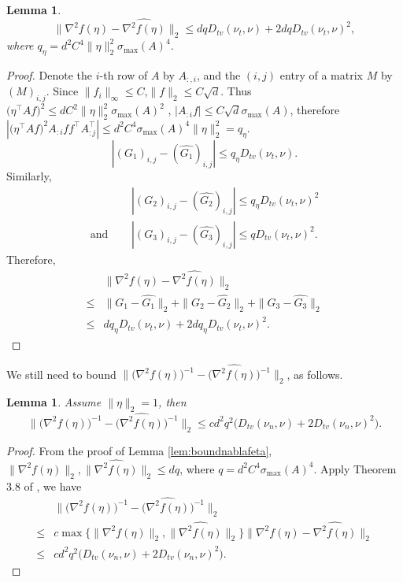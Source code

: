 \documentclass[english]{article} %
\providecommand{\lemmaname}{Lemma}
\theoremstyle{plain}
\newtheorem{lemma}[thm]{\protect\lemmaname}
\theoremstyle{definition}
\theoremstyle{remark}
\begin{document}
\begin{lemma}
\label{lem:nablavariation}
\[
\|\nabla^2 f(\eta) - \widehat{\nabla^2 f(\eta)}  \|_2 \le d q D_{tv}(\nu_t , \nu) + 2dq D_{tv}(\nu_t , \nu)^2,
\]
where $q_{\eta} = d^2C^4\|\eta\|_2^2\sigma_{\max}(A)^4$.
\end{lemma}
\begin{proof}
Denote the $i$-th row of $A$ by $A_{:,i}$, and the $(i,j)$ entry of a matrix $M$ by $(M)_{i,j}$. Since $\|f_i\|_\infty \le C$,$\|f\|_2 \le C\sqrt{d}$. 
Thus $\big(\eta^{\top}Af\big)^2 \le d C^2\|\eta\|_2^2\sigma_{\max}(A)^2$ 
,  $|A_{:i}f| \le C\sqrt{d}\sigma_{\max}(A)$, 
therefore $|\big(\eta^{\top}Af\big)^2 A_{:i}ff^{\top} A_{:j}^{\top}| \le d^2C^4\sigma_{\max}(A)^4 \|\eta\|_2^2 = q_{\eta}$.
\[
|(G_1)_{i,j} - (\widehat{G_1})_{i,j} | \le q_{\eta} D_{tv}(\nu_t , \nu).
\]
Similarly, 
\begin{align*}
& |(G_2)_{i,j} - (\widehat{G_2})_{i,j} | \le q_{\eta} D_{tv}(\nu_t , \nu)^2 \\
\text{and } \quad & |(G_3)_{i,j} - (\widehat{G_3})_{i,j} | \le q D_{tv}(\nu_t , \nu)^2.
\end{align*}
Therefore,
\begin{align*}
	& \|\nabla^2 f(\eta) - \widehat{\nabla^2 f(\eta)}  \|_2 \\
\le & \|G_1 - \widehat{G_1}\|_2 + \|G_2 - \widehat{G_2}\|_2 + \|G_3 - \widehat{G_3}\|_2 \\
\le & d q_{\eta} D_{tv}(\nu_t , \nu) + 2dq_{\eta} D_{tv}(\nu_t , \nu)^2.
\end{align*}
\end{proof}

We still need to bound $\|\big(\nabla^2 f(\eta)\big)^{-1} - \big(\widehat{\nabla^2 f(\eta)}\big)^{-1}  \|_2 $, as follows.
\begin{lemma}
Assume $\|\eta\|_2 = 1$, then 
\[
\|\big(\nabla^2 f(\eta)\big)^{-1} - \big(\widehat{\nabla^2 f(\eta)}\big)^{-1}  \|_2 \le cd^2q^2\big(D_{tv}(\nu_n , \nu) + 2D_{tv}(\nu_n , \nu)^2\big).
\]
\end{lemma}
\begin{proof}
From the proof of Lemma \ref{lem:boundnablafeta}, $\|\nabla^2 f(\eta)\|_2, \|\widehat{\nabla^2 f(\eta)}\|_2 \le dq$, where $q = d^2C^4\sigma_{\max}(A)^4$.
Apply Theorem 3.8 of \citep*{stewart1990matrix}, we have 
\begin{align*}
& \|\big(\nabla^2 f(\eta)\big)^{-1} - \big(\widehat{\nabla^2 f(\eta)}\big)^{-1}  \|_2 \\
\le & c\max\{\|\nabla^2 f(\eta)\|_2, \|\widehat{\nabla^2 f(\eta)}\|_2\} \|\nabla^2 f(\eta) - \widehat{\nabla^2 f(\eta)}\|_2 \\
\le & cd^2q^2\big(D_{tv}(\nu_n , \nu) + 2D_{tv}(\nu_n , \nu)^2\big).
\end{align*}

\end{proof}
\fi
\end{document}

